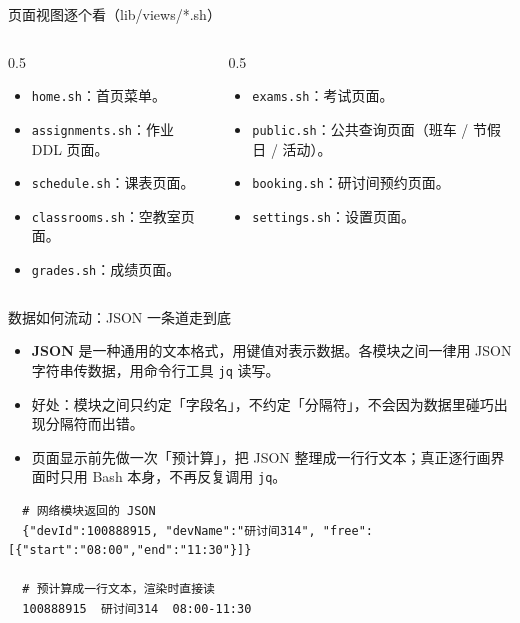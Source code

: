 \documentclass[aspectratio=169]{beamer}
\begin{document}
\begin{frame}{页面视图逐个看（lib/views/*.sh）}
  \begin{columns}[T]
    \begin{column}{0.5\textwidth}
      \begin{itemize}
        \setlength\itemsep{0.5em}
        \item \texttt{home.sh}：首页菜单。
        \item \texttt{assignments.sh}：作业 DDL 页面。
        \item \texttt{schedule.sh}：课表页面。
        \item \texttt{classrooms.sh}：空教室页面。
        \item \texttt{grades.sh}：成绩页面。
      \end{itemize}
    \end{column}
    \begin{column}{0.5\textwidth}
      \begin{itemize}
        \setlength\itemsep{0.5em}
        \item \texttt{exams.sh}：考试页面。
        \item \texttt{public.sh}：公共查询页面（班车 / 节假日 / 活动）。
        \item \texttt{booking.sh}：研讨间预约页面。
        \item \texttt{settings.sh}：设置页面。
      \end{itemize}
    \end{column}
  \end{columns}
\end{frame}

\begin{frame}[fragile]{数据如何流动：JSON 一条道走到底}
  \begin{itemize}
    \setlength\itemsep{0.5em}
    \item \textbf{JSON} 是一种通用的文本格式，用键值对表示数据。各模块之间一律用 JSON 字符串传数据，用命令行工具 \texttt{jq} 读写。
    \item 好处：模块之间只约定「字段名」，不约定「分隔符」，不会因为数据里碰巧出现分隔符而出错。
    \item 页面显示前先做一次「预计算」，把 JSON 整理成一行行文本；真正逐行画界面时只用 Bash 本身，不再反复调用 \texttt{jq}。
  \end{itemize}
  {\footnotesize
  \begin{verbatim}
  # 网络模块返回的 JSON
  {"devId":100888915, "devName":"研讨间314", "free":[{"start":"08:00","end":"11:30"}]}

  # 预计算成一行文本，渲染时直接读
  100888915  研讨间314  08:00-11:30
  \end{verbatim}
  }
\end{frame}
\end{document}
